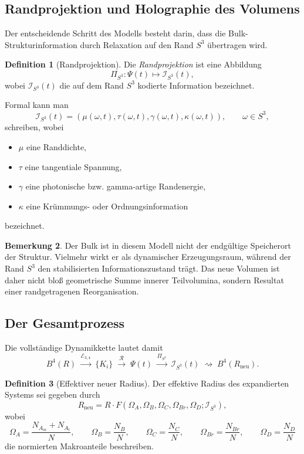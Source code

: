 \documentclass[11pt,a4paper]{article}
\theoremstyle{definition}
\newtheorem{definition}{Definition}[section]
\newtheorem{remark}[definition]{Bemerkung}
\theoremstyle{plain}
\theoremstyle{remark}
\begin{document}
	\subsection{Randprojektion und Holographie des Volumens}
	
	Der entscheidende Schritt des Modells besteht darin, dass die Bulk-Strukturinformation durch Relaxation auf den Rand \(S^3\) übertragen wird.
	
	\begin{definition}[Randprojektion]
		Die \emph{Randprojektion} ist eine Abbildung
		\[
		\Pi_{S^3}:\Psi(t)\longmapsto \mathcal{I}_{S^3}(t),
		\]
		wobei \(\mathcal{I}_{S^3}(t)\) die auf dem Rand \(S^3\) kodierte Information bezeichnet.
	\end{definition}
	
	Formal kann man
	\[
	\mathcal{I}_{S^3}(t)
	=
	(\mu(\omega,t),\tau(\omega,t),\gamma(\omega,t),\kappa(\omega,t)),
	\qquad \omega\in S^3,
	\]
	schreiben, wobei
	\begin{itemize}
		\item \(\mu\) eine Randdichte,
		\item \(\tau\) eine tangentiale Spannung,
		\item \(\gamma\) eine photonische bzw. gamma-artige Randenergie,
		\item \(\kappa\) eine Krümmungs- oder Ordnungsinformation
	\end{itemize}
	bezeichnet.
	
	\begin{remark}
		Der Bulk ist in diesem Modell nicht der endgültige Speicherort der Struktur. Vielmehr wirkt er als dynamischer Erzeugungsraum, während der Rand \(S^3\) den stabilisierten Informationszustand trägt. Das neue Volumen ist daher nicht bloß geometrische Summe innerer Teilvolumina, sondern Resultat einer randgetragenen Reorganisation.
	\end{remark}
	
	\subsection{Der Gesamtprozess}
	
	Die vollständige Dynamikkette lautet damit
	\[
	B^4(R)
	\;\xrightarrow{\mathcal{E}_{3,4}}\;
	\{K_i\}
	\;\xrightarrow{\mathcal{R}}\;
	\Psi(t)
	\;\xrightarrow{\Pi_{S^3}}\;
	\mathcal{I}_{S^3}(t)
	\;\rightsquigarrow\;
	B^4(R_{\mathrm{neu}}).
	\]
	
	\begin{definition}[Effektiver neuer Radius]
		Der effektive Radius des expandierten Systems sei gegeben durch
		\[
		R_{\mathrm{neu}}
		=
		R\cdot
		F(\Omega_A,\Omega_B,\Omega_C,\Omega_{Br},\Omega_D;\mathcal{I}_{S^3}),
		\]
		wobei
		\[
		\Omega_A=\frac{N_{A_m}+N_{A_t}}{N},
		\qquad
		\Omega_B=\frac{N_B}{N},
		\qquad
		\Omega_C=\frac{N_C}{N},
		\qquad
		\Omega_{Br}=\frac{N_{Br}}{N},
		\qquad
		\Omega_D=\frac{N_D}{N}
		\]
		die normierten Makroanteile beschreiben.
	\end{definition}
	
\end{document}
